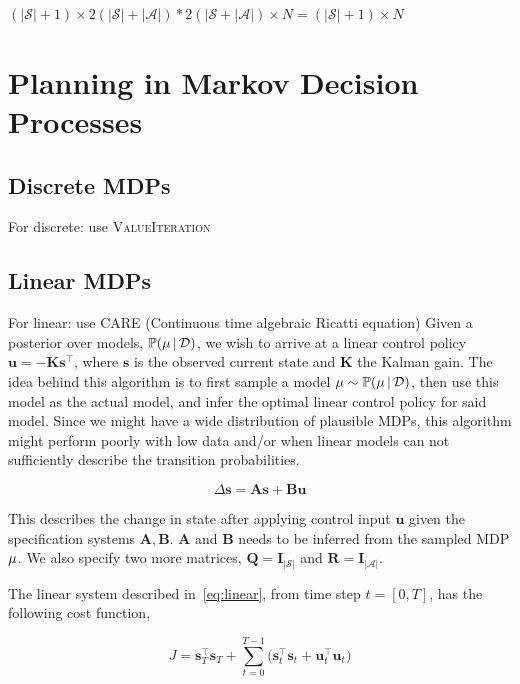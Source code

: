 $(|\mathcal{S}|+1) \times 2(|\mathcal{S}|+|\mathcal{A}|) * 2(|\mathcal{S}+|\mathcal{A}|)\times N= (|\mathcal{S}|+1) \times N$

\section{Planning in Markov Decision Processes}\label{sec:planning}

\subsection{Discrete MDPs}
For discrete: use \textsc{ValueIteration}

\subsection{Linear MDPs}

For linear: use \textsc{CARE} (Continuous time algebraic Ricatti equation)
Given a posterior over models, $\mathbb{P}(\mu \, | \, \mathcal{D})$, we wish to arrive at a linear control policy $\bm{u} = -\mathbf{K}\bm{s}^\top$, where $\bm{s}$ is the observed current state and $\mathbf{K}$ the Kalman gain. The idea behind this algorithm is to first sample a model $\mu \sim \mathbb{P}(\mu \, | \, \mathcal{D})$, then use this model as the actual model, and infer the optimal linear control policy for said model. Since we might have a wide distribution of plausible MDPs, this algorithm might perform poorly with low data and/or when linear models can not sufficiently describe the transition probabilities.

\begin{equation}\label{eq:linear}
    \Delta \bm{s} = \mathbf{A} \bm{s} + \mathbf{B} \bm{u}
\end{equation}

This describes the change in state after applying control input $\bm{u}$ given the specification systems $\mathbf{A}, \mathbf{B}$. $\mathbf{A}$ and $\mathbf{B}$ needs to be inferred from the sampled MDP $\mu$. We also specify two more matrices, $\mathbf{Q} = \mathbf{I}_{|\mathcal{S}|}$ and $\mathbf{R} = \mathbf{I}_{|\mathcal{A}|}$.

The linear system described in~\ref{eq:linear}, from time step $t = [0, T]$, has the following cost function,

\begin{equation}
    J = \bm{s}_T^\top \bm{s}_T + \sum_{t=0}^{T-1} \Big(\bm{s}_t^\top \bm{s}_t + \bm{u}_t^\top \bm{u}_t\Big)
\end{equation}

